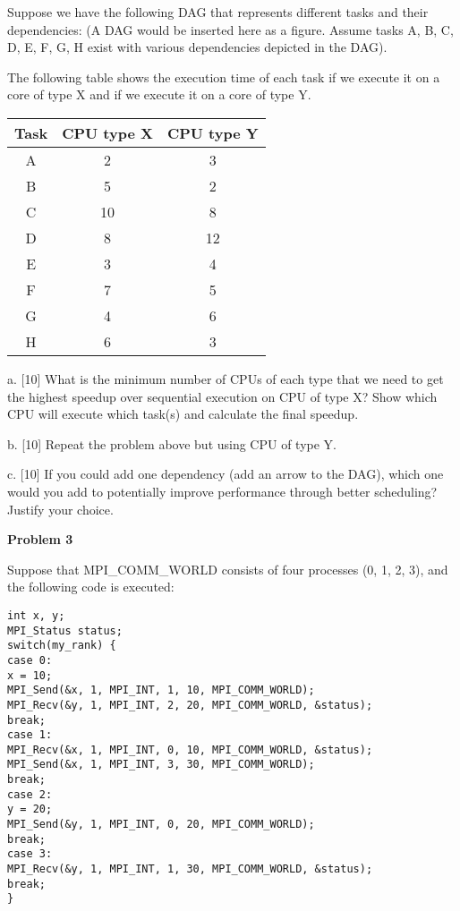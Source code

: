 \documentclass{article}
\begin{document}
Suppose we have the following DAG that represents different tasks and their dependencies: (A DAG would be inserted here as a figure.  Assume tasks A, B, C, D, E, F, G, H exist with various dependencies depicted in the DAG).

The following table shows the execution time of each task if we execute it on a core of type X and if we execute it on a core of type Y.

\begin{tabular}{|c|c|c|}
\hline
Task & CPU type X & CPU type Y \\ \hline
A & 2 & 3 \\ \hline
B & 5 & 2 \\ \hline
C & 10 & 8 \\ \hline
D & 8 & 12 \\ \hline
E & 3 & 4 \\ \hline
F & 7 & 5 \\ \hline
G & 4 & 6 \\ \hline
H & 6 & 3 \\ \hline
\end{tabular}

a. [10] What is the minimum number of CPUs of each type that we need to get the highest speedup over sequential execution on CPU of type X? Show which CPU will execute which task(s) and calculate the final speedup.

b. [10] Repeat the problem above but using CPU of type Y.

c. [10]  If you could add one dependency (add an arrow to the DAG), which one would you add to potentially improve performance through better scheduling? Justify your choice.


\vspace{1cm}

\textbf{Problem 3}

Suppose that MPI\_COMM\_WORLD consists of four processes (0, 1, 2, 3), and the following code is executed:

\begin{verbatim}
int x, y;
MPI_Status status;
switch(my_rank) {
case 0:
x = 10;
MPI_Send(&x, 1, MPI_INT, 1, 10, MPI_COMM_WORLD);
MPI_Recv(&y, 1, MPI_INT, 2, 20, MPI_COMM_WORLD, &status);
break;
case 1:
MPI_Recv(&x, 1, MPI_INT, 0, 10, MPI_COMM_WORLD, &status);
MPI_Send(&x, 1, MPI_INT, 3, 30, MPI_COMM_WORLD);
break;
case 2:
y = 20;
MPI_Send(&y, 1, MPI_INT, 0, 20, MPI_COMM_WORLD);
break;
case 3:
MPI_Recv(&y, 1, MPI_INT, 1, 30, MPI_COMM_WORLD, &status);
break;
}
\end{verbatim}
\end{document}
